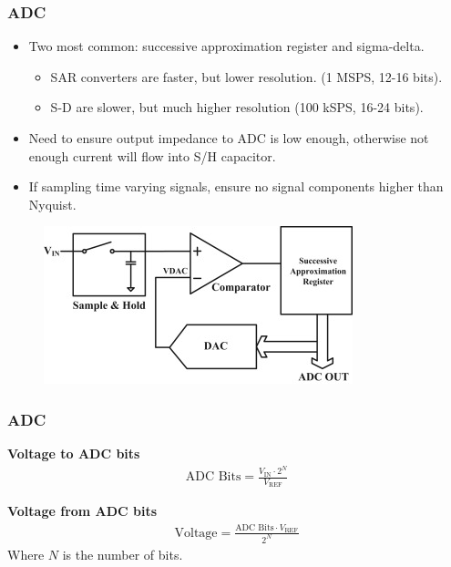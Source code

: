 \documentclass[t]{beamer}
\begin{document}

\begin{frame}[t]
\frametitle{ADC}
\begin{itemize}
	\item Two most common: successive approximation register and sigma-delta.
	\begin{itemize}
		\item SAR converters are faster, but lower resolution. (1 MSPS, 12-16 bits).
		\item S-D are slower, but much higher resolution (100 kSPS, 16-24 bits).
	\end{itemize}
	\item Need to ensure output impedance to ADC is low enough, otherwise not enough current will flow into S/H capacitor.
	\item If sampling time varying signals, ensure no signal components higher than Nyquist. 
\end{itemize}

\begin{figure}
	\includegraphics[width=0.6\linewidth]{sar.jpg}
\end{figure}
\end{frame}


\begin{frame}[t]
\frametitle{ADC}
\textbf{Voltage to ADC bits}
\begin{align*}
\text{ADC Bits} = \frac{V_{\text{IN}} \cdot 2^N}{V_{\text{REF}}}
\end{align*}

\textbf{Voltage from ADC bits}
\begin{align*}
\text{Voltage} = \frac{\text{ADC Bits} \cdot V_{\text{REF}}}{2^N}
\end{align*}
Where $N$ is the number of bits. 

\end{frame}
\end{document}
